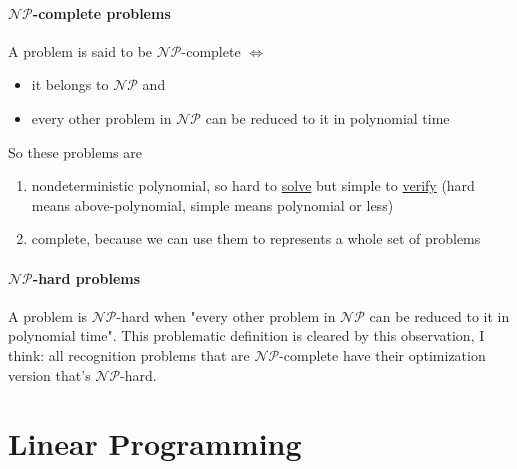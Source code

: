 \documentclass{article}
\begin{document}
				\paragraph{$\mathcal{NP}$-complete problems}
					A problem is said to be $\mathcal{NP}$-complete $\Leftrightarrow$
					\begin{itemize}
						\item it belongs to $\mathcal{NP}$ and
						\item every other problem in $\mathcal{NP}$ can be reduced to it in polynomial time
					\end{itemize}
					So these problems are
					\begin{enumerate}
						\item nondeterministic polynomial, so hard to \underline{solve} but simple to \underline{verify} (hard means above-polynomial, simple means polynomial or less)
						\item complete, because we can use them to represents a whole set of problems
					\end{enumerate}
				
				\paragraph{$\mathcal{NP}$-hard problems}
					A problem is $\mathcal{NP}$-hard when "every other problem in $\mathcal{NP}$ can be reduced to it in polynomial time". This problematic definition is cleared by this observation, I think: all recognition problems that are $\mathcal{NP}$-complete have their optimization version that's $\mathcal{NP}$-hard. 

	\clearpage
	\section{Linear Programming}
\end{document}
